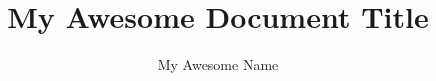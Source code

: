 \title{My Awesome Document Title}

\author{My Awesome Name}

\maketitle

\thispagestyle{empty}
\clearpage
{} 